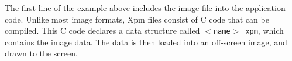The first line of the example above includes the image file into the application code. Unlike most image formats, Xpm files consist of C code that can be compiled. This C code declares a data structure called {\tt $<$name$>$\_\-xpm}, which contains the image data. The data is then loaded into an off-screen image, and drawn to the screen.


